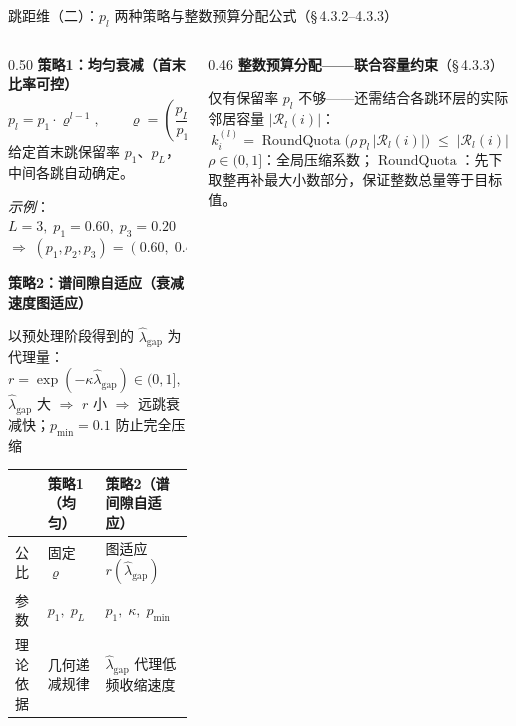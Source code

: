 \documentclass[aspectratio=169,9pt,xcolor=dvipsnames]{beamer}
\newcommand{\blue}[1]{\textcolor{mynavy}{#1}}
\begin{document}
\begin{frame}{跳距维（二）：$p_l$ 两种策略与整数预算分配公式（§\,4.3.2--4.3.3）}
\begin{columns}[T]

\begin{column}{0.50\textwidth}
  \textbf{\blue{策略1：均匀衰减（首末比率可控）}}
  \begin{equation*}
    p_l = p_1\cdot\varrho^{l-1},\qquad
    \varrho=\!\left(\frac{p_L}{p_1}\right)^{\!\frac{1}{L-1}}\!\in(0,1)
  \end{equation*}
  给定首末跳保留率 $p_1$、$p_L$，中间各跳自动确定。

  \textit{示例}：$L=3,\;p_1=0.60,\;p_3=0.20$\\
  $\Rightarrow\;(p_1,p_2,p_3)=(0.60,\;0.40,\;0.20)$

  \vspace{0.1cm}
  \textbf{\blue{策略2：谱间隙自适应（衰减速度图适应）}}

  以预处理阶段得到的 $\hat{\lambda}_{\mathrm{gap}}$ 为代理量：
  \begin{equation*}
    r=\exp(-\kappa\hat{\lambda}_{\mathrm{gap}})\in(0,1],\qquad
    p_l=\max\!\bigl\{p_{\min},\;p_1\cdot r^{l-1}\bigr\}
  \end{equation*}
  $\hat{\lambda}_{\mathrm{gap}}$ 大 $\Rightarrow$ $r$ 小 $\Rightarrow$ 远跳衰减快；$p_{\min}=0.1$ 防止完全压缩

  \vspace{0.08cm}
  \small
  \begin{tabular}{lll}
    \toprule
    & 策略1（均匀） & 策略2（谱间隙自适应） \\
    \midrule
    公比 & 固定 $\varrho$ & 图适应 $r(\hat{\lambda}_{\mathrm{gap}})$ \\
    参数 & $p_1,\;p_L$ & $p_1,\;\kappa,\;p_{\min}$ \\
    理论依据 & 几何递减规律 & $\hat{\lambda}_{\mathrm{gap}}$ 代理低频收缩速度 \\
    \bottomrule
  \end{tabular}
\end{column}

\begin{column}{0.46\textwidth}
  \textbf{\blue{整数预算分配——联合容量约束}}（§\,4.3.3）

  仅有保留率 $p_l$ 不够——还需结合各跳环层的实际邻居容量 $|\mathcal{R}_l(i)|$：
  \begin{equation*}
      k_i^{(l)}
      =\operatorname{RoundQuota}\!\bigl(\rho\,p_l\,|\mathcal{R}_l(i)|\bigr)
      \;\leq\;|\mathcal{R}_l(i)|
    \end{equation*}
      $\rho\in(0,1]$：全局压缩系数；$\operatorname{RoundQuota}$：先下取整再补最大小数部分，保证整数总量等于目标值。
  

\end{column}
\end{columns}
\end{frame}
\end{document}
